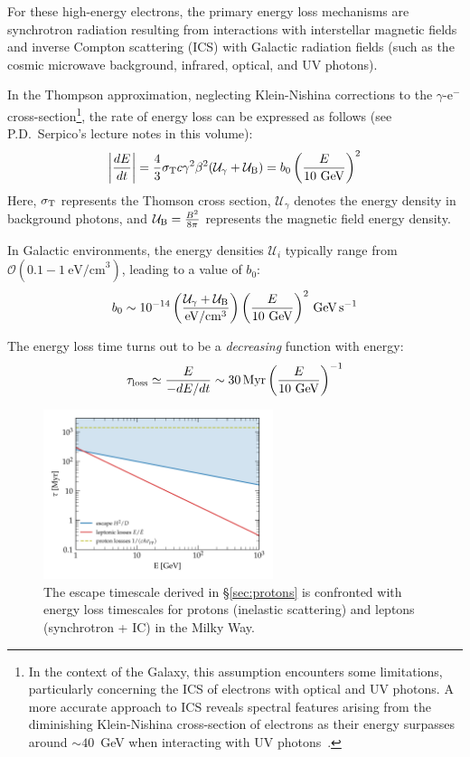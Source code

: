 For these high-energy electrons, the primary energy loss mechanisms are synchrotron radiation resulting from interactions with interstellar magnetic fields and inverse Compton scattering (ICS) with Galactic radiation fields (such as the cosmic microwave background, infrared, optical, and UV photons).

In the Thompson approximation, neglecting Klein-Nishina corrections to the $\gamma$-e$^-$ cross-section\footnote{In the context of the Galaxy, this assumption encounters some limitations, particularly concerning the ICS of electrons with optical and UV photons. A more accurate approach to ICS reveals spectral features arising from the diminishing Klein-Nishina cross-section of electrons as their energy surpasses around $\sim 40$~GeV when interacting with UV photons~\cite{Agaronyan1985ap,vanderwalt1991mnras,Evoli2020prl}.}, the rate of energy loss can be expressed as follows (see P.D.~Serpico's lecture notes in this volume):
%
\begin{equation}
\left| \frac{dE}{dt} \right| = \frac{4}{3} \sigma_{\rm T} c \gamma^2 \beta^2 (\mathcal U_\gamma + \mathcal U_{\rm B}) = b_0 \left( \frac{E}{10~\rm GeV} \right)^2
\end{equation}
%
Here, $\sigma_{\rm T}$ represents the Thomson cross section, $\mathcal U_\gamma$ denotes the energy density in background photons, and $\mathcal U_{\rm B} = \frac{B^2}{8\pi}$ represents the magnetic field energy density.

In Galactic environments, the energy densities $\mathcal U_i$ typically range from $\mathcal O(0.1-1~\text{eV/cm}^3)$, leading to a value of $b_0$:
%
\begin{equation}
b_0 \sim  10^{-14} \left(\frac{\mathcal U_\gamma + \mathcal U_{\rm B}}{\rm eV/cm^3}\right) \left(\frac{E}{10~\rm GeV}\right)^2 \, \text{GeV} \, \text{s}^{-1}
\end{equation}

The energy loss time turns out to be a \emph{decreasing} function with energy:
%
\begin{equation}
\tau_{\rm loss} \simeq \frac{E}{-dE/dt} \sim 30 \, \text{Myr} \left(\frac{E}{10~\rm GeV}\right)^{-1}
\end{equation}

\begin{figure}[t]
\centering
\includegraphics[width=0.6\textwidth]{figures/electron_losses.pdf}
\caption{The escape timescale derived in \S\ref{sec:protons} is confronted with energy loss timescales for protons (inelastic scattering) and leptons (synchrotron + IC) in the Milky Way.}
\label{fig:electronlosses}
\end{figure}

